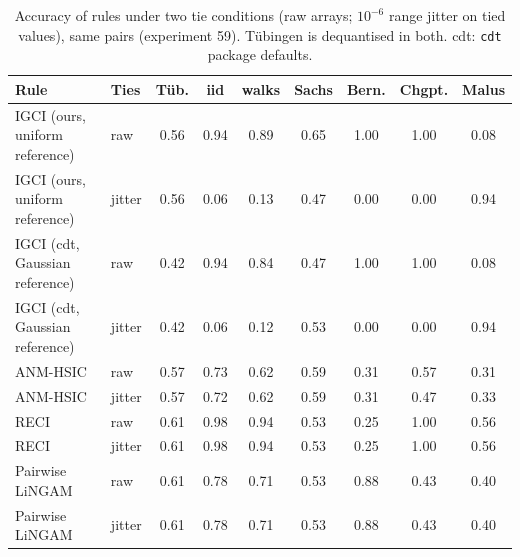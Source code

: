 \begin{table}[t]
\caption{Accuracy of rules under two tie conditions (raw arrays; $10^{-6}$ range jitter on tied values), same pairs (experiment 59). T\"ubingen is dequantised in both. cdt: \texttt{cdt} package defaults.}
\label{tab:ties}
\small
\setlength{\tabcolsep}{3pt}
\begin{tabular}{@{}llccccccc@{}}
\toprule
Rule & Ties & T\"ub. & iid & walks & Sachs & Bern. & Chgpt. & Malus\\
\midrule
IGCI (ours, uniform reference) & raw & 0.56 & 0.94 & 0.89 & 0.65 & 1.00 & 1.00 & 0.08\\
IGCI (ours, uniform reference) & jitter & 0.56 & 0.06 & 0.13 & 0.47 & 0.00 & 0.00 & 0.94\\
IGCI (cdt, Gaussian reference) & raw & 0.42 & 0.94 & 0.84 & 0.47 & 1.00 & 1.00 & 0.08\\
IGCI (cdt, Gaussian reference) & jitter & 0.42 & 0.06 & 0.12 & 0.53 & 0.00 & 0.00 & 0.94\\
ANM-HSIC & raw & 0.57 & 0.73 & 0.62 & 0.59 & 0.31 & 0.57 & 0.31\\
ANM-HSIC & jitter & 0.57 & 0.72 & 0.62 & 0.59 & 0.31 & 0.47 & 0.33\\
RECI & raw & 0.61 & 0.98 & 0.94 & 0.53 & 0.25 & 1.00 & 0.56\\
RECI & jitter & 0.61 & 0.98 & 0.94 & 0.53 & 0.25 & 1.00 & 0.56\\
Pairwise LiNGAM & raw & 0.61 & 0.78 & 0.71 & 0.53 & 0.88 & 0.43 & 0.40\\
Pairwise LiNGAM & jitter & 0.61 & 0.78 & 0.71 & 0.53 & 0.88 & 0.43 & 0.40\\
\bottomrule
\end{tabular}
\end{table}

